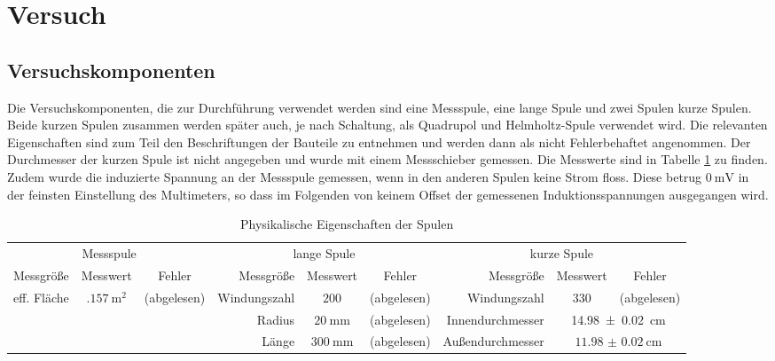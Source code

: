\section{Versuch}
\subsection{Versuchskomponenten}
Die Versuchskomponenten, die zur Durchführung verwendet werden sind eine Messspule, eine lange Spule und zwei Spulen kurze Spulen. Beide kurzen Spulen zusammen werden später auch, je nach Schaltung, als Quadrupol und Helmholtz-Spule verwendet wird. Die relevanten Eigenschaften sind zum Teil den Beschriftungen der Bauteile zu entnehmen und werden dann als nicht Fehlerbehaftet angenommen. Der Durchmesser der kurzen Spule ist nicht angegeben und wurde mit einem Messschieber gemessen. Die Messwerte sind in Tabelle \ref{tab:eigenschaftenSpulen} zu finden. Zudem wurde die induzierte Spannung an der Messspule gemessen, wenn in den anderen Spulen keine Strom floss. Diese betrug $ \SI{0}{\milli\volt} $ in der feinsten Einstellung des Multimeters, so dass im Folgenden von keinem Offset der gemessenen Induktionsspannungen ausgegangen wird.
\begin{landscape}
\begin{table}
\thispagestyle{plain}
\begin{tabular}{r|cc||r|cc||r|cc}
	\multicolumn{3}{c}{Messspule} & \multicolumn{3}{c}{lange Spule} & \multicolumn{3}{c}{kurze Spule} \\
	Messgröße & Messwert & Fehler & Messgröße & Messwert & Fehler & Messgröße & Messwert & Fehler \\ \hline
	eff. Fläche & $ \SI{.157}{\square\meter} $ & (abgelesen) & Windungszahl & $ 200 $ & (abgelesen) & Windungszahl & 330 & (abgelesen) \\
	& & & Radius & $ \SI{20}{\milli\meter} $ & (abgelesen) & Innendurchmesser & \multicolumn{2}{c}{\SI{14.98(2)}{\centi\meter}} \\
	& & & Länge & $ \SI{300}{\milli\meter} $ & (abgelesen) & Außendurchmesser & \multicolumn{2}{c}{$ \SI{11.98(2)}{\centi\meter} $}	
\end{tabular}
\caption{Physikalische Eigenschaften der Spulen}
\label{tab:eigenschaftenSpulen}
\end{table}
\end{landscape}

